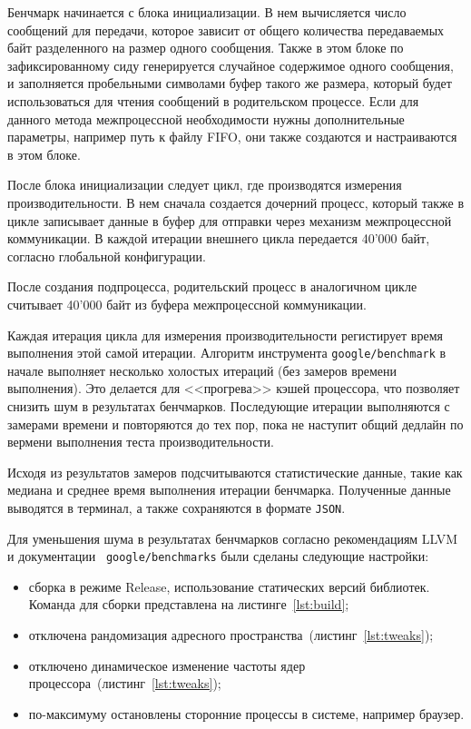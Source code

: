 \documentclass[14pt, russian]{scrartcl}
\newcommand{\refAlgo}[1]{(листинг~\ref{#1})}
\begin{document}
Бенчмарк начинается с блока инициализации. В нем вычисляется число сообщений для
передачи, которое зависит от общего количества передаваемых байт разделенного на
размер одного сообщения. Также в этом блоке по зафиксированному сиду
генерируется случайное содержимое одного сообщения, и заполняется пробельными
символами буфер такого же размера, который будет использоваться для чтения
сообщений в родительском процессе. Если для данного метода межпроцессной
необходимости нужны дополнительные параметры, например путь к файлу FIFO, они
также создаются и настраиваются в этом блоке.

После блока инициализации следует цикл, где производятся измерения
производительности. В нем сначала создается дочерний процесс, который также в
цикле записывает данные в буфер для отправки через механизм межпроцессной
коммуникации. В каждой итерации внешнего цикла передается 40'000 байт, согласно
глобальной конфигурации.

После создания подпроцесса, родительский процесс в аналогичном цикле считывает
40'000 байт из буфера межпроцессной коммуникации.

Каждая итерация цикла для измерения производительности регистирует время
выполнения этой самой итерации. Алгоритм инструмента \verb|google/benchmark| в
начале выполняет несколько холостых итераций (без замеров времени выполнения).
Это делается для <<прогрева>> кэшей процессора, что позволяет снизить шум в
результатах бенчмарков. Последующие итерации выполняются с замерами времени и
повторяются до тех пор, пока не наступит общий дедлайн по вермени выполнения
теста производительности.

Исходя из результатов замеров подсчитываются статистические данные, такие как
медиана и среднее время выполнения итерации бенчмарка. Полученные данные
выводятся в терминал, а также сохраняются в формате \verb|JSON|.

Для уменьшения шума в результатах бенчмарков согласно рекомендациям
LLVM\cite{LLVM_noise} и документации~\cite{gbench_noise}
\verb|google/benchmarks| были сделаны следующие настройки:

\begin{itemize}
  \item сборка в режиме Release, использование статических версий библиотек.
        Команда для сборки представлена на листинге~\ref{lst:build};
  \item отключена рандомизация адресного пространства~\refAlgo{lst:tweaks};
  \item отключено динамическое изменение частоты ядер
        процессора~\refAlgo{lst:tweaks};
  \item по-максимуму остановлены сторонние процессы в системе, например браузер.
\end{itemize}
\end{document}

